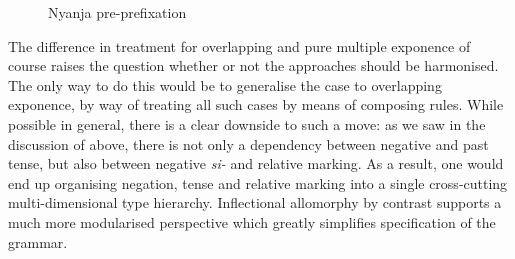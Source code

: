 \documentclass[output=paper,biblatex,babelshorthands,newtxmath,draftmode,colorlinks,citecolor=brown]{langscibook}
\begin{document}
\begin{exe}
\begin{xlist}
\begin{exe}
\begin{xlist}
\begin{sidewaysfigure}
  \centering
{}    
  \caption{Nyanja pre-prefixation \citep[210]{Crysmann:14:OUP}}\label{fig:Nyanja}
\end{sidewaysfigure}

The difference in treatment for overlapping and pure multiple
exponence of course raises the question whether or not the approaches
should be harmonised. The only way to do this would be to generalise
the  case to overlapping exponence, by way of treating all such
cases by means of composing rules. While possible in general, there is
a clear downside to such a move: as we saw in the discussion of
 above, there is not only a dependency between negative and
past tense, but also between negative \textit{si-} and relative
marking. As a result, one would end up organising negation, tense and
relative marking into a single cross-cutting multi-dimensional type
hierarchy. Inflectional allomorphy by contrast supports a much more
modularised perspective which greatly simplifies specification of the
grammar.  


\end{xlist}
\end{exe}
\end{xlist}
\end{exe}
\end{document}
